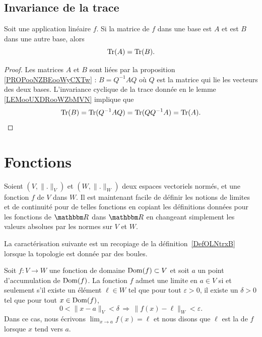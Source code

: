 \subsection{Invariance de la trace}

\begin{proposition}      \label{PROPooRMYQooWkEpJJ}
    Soit une application linéaire \( f\). Si la matrice de \( f\) dans une base est \( A\) et est \( B\) dans une autre base, alors
    \begin{equation}
        \operatorname{Tr}(A)=\operatorname{Tr}(B).
    \end{equation}
\end{proposition}

\begin{proof}
    Les matrices \( A\) et \( B\) sont liées par la proposition \ref{PROPooNZBEooWyCXTw} : \( B=Q^{-1}AQ\) où \( Q\) est la matrice qui lie les vecteurs des deux bases. L'invariance cyclique de la trace donnée en le lemme \ref{LEMooUXDRooWZbMVN} implique que
    \begin{equation}
        \operatorname{Tr}(B)=\operatorname{Tr}(Q^{-1}AQ)=\operatorname{Tr}(QQ^{-1}A)=\operatorname{Tr}(A).
    \end{equation}
\end{proof}




\section{Fonctions}		\label{Sect_fonctions}

Soient $(V,\| . \|_V)$ et $(W,\| . \|_W)$ deux espaces vectoriels normés, et une fonction $f$ de $V$ dans $W$. Il est maintenant facile de définir les notions de limites et de continuité pour de telles fonctions en copiant les définitions données pour les fonctions de $\eR$ dans $\eR$ en changeant simplement les valeurs absolues par les normes sur $V$ et $W$.

La caractérisation suivante est un recopiage de la définition~\ref{DefOLNtrxB} lorsque la topologie est donnée par des boules.
\begin{proposition}\label{PropHOCWooSzrMjl}
	Soit $f\colon V\to W$ une fonction de domaine \( \operatorname{Dom}(f)\subset V\) et soit $a$ un point d'accumulation de $\operatorname{Dom}(f)$.
    La fonction \( f\) admet une limite en $a\in V$ si et seulement s'il existe un élément $\ell\in W$ tel que pour tout $\varepsilon>0$, il existe un $\delta>0$ tel que pour tout $x\in \operatorname{Dom}(f)$,
    \begin{equation}        \label{EqDefLimzxmasubV}
		0<\| x-a \|_V<\delta\,\Rightarrow\,\| f(x)-\ell \|_W<\varepsilon.
	\end{equation}
	Dans ce cas, nous écrivons $\lim_{x\to a} f(x)=\ell$ et nous disons que $\ell$ est la  de $f$ lorsque $x$ tend vers $a$.
\end{proposition}

